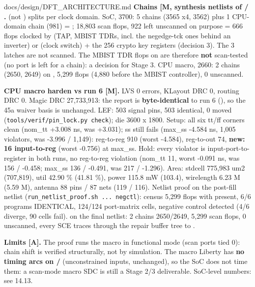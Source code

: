 \begin{relocated}{docs/design/DFT_ARCHITECTURE.md}
\textbf{Chains {[}M, synthesis netlists of
 /
\runid{RUN_2026-10-24_19-19-02}{]}.}
 (not ) splits per clock domain.
SoC, 3700: 5  chains (3565 x4, 3562) plus 1 CPU-domain
chain (981) = ; 18,803 scan flops, 922 left
unscanned on purpose = 666 flops clocked by  (TAP, MBIST
TDRs, incl. the negedge-tck ones behind an inverter) or
 (clock switch) + the 256 crypto key registers
(decision 3). The 3 latches are not scanned. The MBIST TDR flops on
 are therefore \textbf{not} scan-tested (no port is left for a
 chain): a decision for Stage 3. CPU macro, 2660: 2 chains
(2650, 2649) on , 5,299 flops (4,880 before
the MBIST controller), 0 unscanned.

\textbf{CPU macro harden  vs run 6
 {[}M{]}.} LVS 0 errors, KLayout DRC 0,
routing DRC 0. Magic DRC 27,733,913: the report is
\textbf{byte-identical} to run 6 (), so the 45a waiver basis
is unchanged. LEF: 503 signal pins, 503 identical, 0 moved
(\texttt{tools/\allowbreak{}verif/\allowbreak{}pin\_\allowbreak{}lock.\allowbreak{}py\ check});
die 3600 x 1800. Setup: all six tt/ff corners clean (nom\_tt +3.008 ns,
was +3.031); ss still fails (max\_ss -4.584 ns, 1,005 violators, was
-3.996 / 1,149): reg-to-reg 910 (worst -4.584), reg-to-out 74,
\textbf{new: 16  input-to-reg} (worst -0.756) at
max\_ss. Hold: every violator is input-port-to-register in both runs, no
reg-to-reg violation (nom\_tt 11, worst -0.091 ns, was 156 / -0.458;
max\_ss 136 / -0.491, was 217 / -1.296). Area: stdcell 775,983 um2
(707,819), util 42.90 \% (41.81 \%), power 115.8 mW (103.4), wirelength
6.23 M (5.59 M), antenna 88 pins / 87 nets (119 / 116). Netlist proof on
the post-fill netlist
(\texttt{run\_\allowbreak{}netlist\_\allowbreak{}proof.\allowbreak{}sh\ .\allowbreak{}.\allowbreak{}.\allowbreak{}\ negctl}):
census 5,299 flops with  present, 6/6 programs IDENTICAL,
124/124 port-matrix cells, negative control detected (4/6 diverge, 90
cells fail).  on the final netlist: 2 chains
2650/\allowbreak{}2649, 5,299 scan flops, 0 unscanned, every SCE traces
through the repair buffer tree to .

\textbf{Limits {[}A{]}.} The proof runs the macro in functional mode
(scan ports tied 0): chain shift is verified structurally, not by
simulation. The macro Liberty has \textbf{no timing arcs on
 / } (unconstrained inputs,
 unchanged), so the SoC does not time them: a
scan-mode macro SDC is still a Stage 2/3 deliverable. SoC-level numbers:
see 14.13.


\end{relocated}
